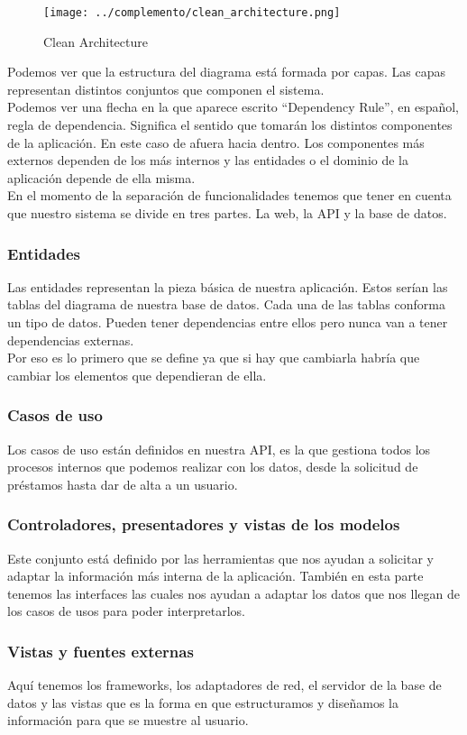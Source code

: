 \begin{figure}
    \texttt{[image: ../complemento/clean\_architecture.png]}
    \caption{Clean Architecture}\label{clean_architecture_diagram}
\end{figure}

Podemos ver que la estructura del diagrama está formada por capas. Las capas representan distintos conjuntos que componen el sistema.
\\Podemos ver una flecha en la que aparece escrito ``Dependency Rule'', en español, regla de dependencia. Significa el sentido que tomarán los distintos componentes de la aplicación. En este caso de afuera hacia dentro. Los componentes más externos dependen de los más internos y las entidades o el dominio de la aplicación depende de ella misma.
\\En el momento de la separación de funcionalidades tenemos que tener en cuenta que nuestro sistema se divide en tres partes. La web, la API y la base de datos.

\subsubsection{Entidades}
Las entidades representan la pieza básica de nuestra aplicación. Estos serían las tablas del diagrama de nuestra base de datos. Cada una de las tablas conforma un tipo de datos. Pueden tener dependencias entre ellos pero nunca van a tener dependencias externas.
\\Por eso es lo primero que se define ya que si hay que cambiarla habría que cambiar los elementos que dependieran de ella.

\subsubsection{Casos de uso}
Los casos de uso están definidos en nuestra API, es la que gestiona todos los procesos internos que podemos realizar con los datos, desde la solicitud de préstamos hasta dar de alta a un usuario.

\subsubsection{Controladores, presentadores y vistas de los modelos}
Este conjunto está definido por las herramientas que nos ayudan a solicitar y adaptar la información más interna de la aplicación. También en esta parte tenemos las interfaces las cuales nos ayudan a adaptar los datos que nos llegan de los casos de usos para poder interpretarlos.

\subsubsection{Vistas y fuentes externas}
Aquí tenemos los frameworks, los adaptadores de red, el servidor de la base de datos y las vistas que es la forma en que estructuramos y diseñamos la información para que se muestre al usuario.